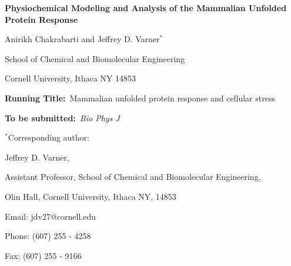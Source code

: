 \documentclass[12pt]{article}
\begin{document}
\begin{titlepage}
{\par\centering\textbf{\Large Physiochemical Modeling and Analysis of the Mammalian Unfolded Protein Response}}
\vspace{0.05in}
{\par \centering \large{Anirikh Chakrabarti and Jeffrey D. Varner$^{*}$}}
\vspace{0.1in}
{\par \centering \large{School of Chemical and Biomolecular Engineering}}
{\par \centering \large{Cornell University, Ithaca NY 14853}}
\vspace{0.1in}
{\par \centering \textbf{Running Title:}~Mammalian unfolded protein response and cellular stress}
\vspace{0.1in}
{\par \centering \textbf{To be submitted:}~\emph{Bio Phys J}}
\vspace{0.5in}
{\par \centering $^{*}$Corresponding author:}
{\par \centering Jeffrey D. Varner,}
{\par \centering Assistant Professor, School of Chemical and Biomolecular Engineering,}
{\par {} Olin Hall, Cornell University, Ithaca NY, 14853} 
{\par \centering Email: jdv27@cornell.edu} 
{\par \centering Phone: (607) 255 - 4258}
{\par \centering Fax: (607) 255 - 9166}
\end{titlepage}
\date{}
\thispagestyle{empty}
\pagebreak
\end{document}
